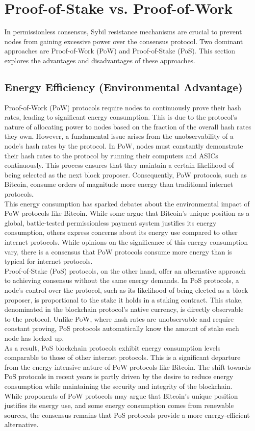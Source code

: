 \section{Proof-of-Stake vs. Proof-of-Work}
In permissionless consensus, Sybil resistance mechanisms are crucial to prevent nodes from gaining excessive power over the consensus protocol. Two dominant approaches are Proof-of-Work (PoW) and Proof-of-Stake (PoS). This section explores the advantages and disadvantages of these approaches.
\subsection{Energy Efficiency (Environmental Advantage)}
Proof-of-Work (PoW) protocols require nodes to continuously prove their hash rates, leading to significant energy consumption. This is due to the protocol's nature of allocating power to nodes based on the fraction of the overall hash rates they own. However, a fundamental issue arises from the unobservability of a node's hash rates by the protocol. In PoW, nodes must constantly demonstrate their hash rates to the protocol by running their computers and ASICs continuously. This process ensures that they maintain a certain likelihood of being selected as the next block proposer. Consequently, PoW protocols, such as Bitcoin, consume orders of magnitude more energy than traditional internet protocols.\\
This energy consumption has sparked debates about the environmental impact of PoW protocols like Bitcoin. While some argue that Bitcoin's unique position as a global, battle-tested permissionless payment system justifies its energy consumption, others express concerns about its energy use compared to other internet protocols. While opinions on the significance of this energy consumption vary, there is a consensus that PoW protocols consume more energy than is typical for internet protocols.\\
Proof-of-Stake (PoS) protocols, on the other hand, offer an alternative approach to achieving consensus without the same energy demands. In PoS protocols, a node's control over the protocol, such as its likelihood of being elected as a block proposer, is proportional to the stake it holds in a staking contract. This stake, denominated in the blockchain protocol's native currency, is directly observable to the protocol. Unlike PoW, where hash rates are unobservable and require constant proving, PoS protocols automatically know the amount of stake each node has locked up.\\
As a result, PoS blockchain protocols exhibit energy consumption levels comparable to those of other internet protocols. This is a significant departure from the energy-intensive nature of PoW protocols like Bitcoin. The shift towards PoS protocols in recent years is partly driven by the desire to reduce energy consumption while maintaining the security and integrity of the blockchain.\\
While proponents of PoW protocols may argue that Bitcoin's unique position justifies its energy use, and some energy consumption comes from renewable sources, the consensus remains that PoS protocols provide a more energy-efficient alternative.

